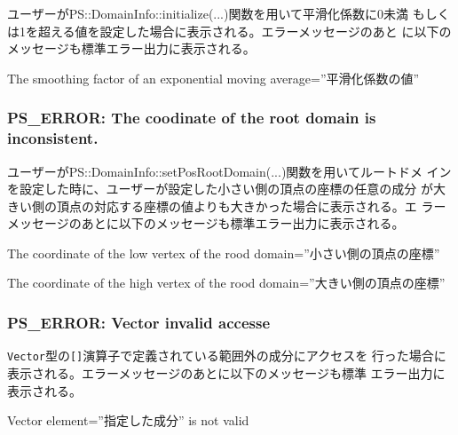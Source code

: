 ユーザーがPS::DomainInfo::initialize(...)関数を用いて平滑化係数に0未満
もしくは1を超える値を設定した場合に表示される。エラーメッセージのあと
に以下のメッセージも標準エラー出力に表示される。

\begin{screen}
  The smoothing factor of an exponential moving average=''平滑化係数の値''
\end{screen}

\subsubsection{PS\_ERROR: The coodinate of the root domain is inconsistent.}

ユーザーがPS::DomainInfo::setPosRootDomain(...)関数を用いてルートドメ
インを設定した時に、ユーザーが設定した小さい側の頂点の座標の任意の成分
が大きい側の頂点の対応する座標の値よりも大きかった場合に表示される。エ
ラーメッセージのあとに以下のメッセージも標準エラー出力に表示される。

\begin{screen}
  The coordinate of the low vertex of the rood domain=''小さい側の頂点の座標''
  
  The coordinate of the high vertex of the rood domain=''大きい側の頂点の座標''  
\end{screen}


\subsubsection{PS\_ERROR: Vector invalid accesse}
\label{sec:errormessage:vector_invalid_access}


{\tt Vector}型の{\tt []}演算子で定義されている範囲外の成分にアクセスを
行った場合に表示される。エラーメッセージのあとに以下のメッセージも標準
エラー出力に表示される。

\begin{screen}
  Vector element=''指定した成分'' is not valid
\end{screen}
